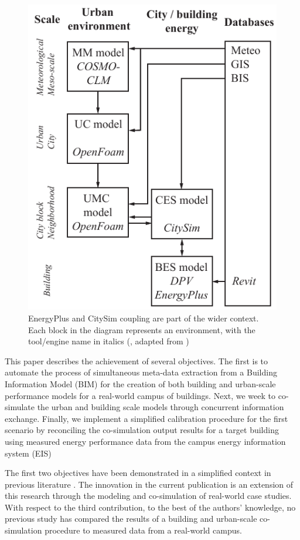 \documentclass{tBPS2e}
\theoremstyle{plain}
\theoremstyle{definition}
\theoremstyle{remark}
\newcommand{\noteDT}[1]{\footnote{\textcolor{green}{#1}}}
\begin{document}
\begin{figure}[H]
\centering
\includegraphics[scale=0.7]{figures/UMEM_overview_new}
\caption{EnergyPlus and CitySim coupling are part of the wider context. Each
block in the diagram represents an environment, with the tool/engine name in
italics (\citep{thomas_multiscale_2014}, adapted from \citep{dorer_modelling_2013})}
\label{fig:UMEM}
\end{figure}

This paper describes the achievement of several objectives. The first is to
automate the process of simultaneous meta-data extraction from a
Building Information Model (BIM) for the creation of both building and
urban-scale performance models for a real-world campus of buildings. Next, we week to 
co-simulate the urban and building scale models through concurrent information exchange.
Finally, we implement a simplified calibration procedure for the first scenario by 
reconciling the co-simulation output results for a target building using measured energy 
performance data from the campus energy information system (EIS)

The first two objectives have been demonstrated in a simplified context in
previous literature \citep{thomas_customizable_2012,miller_long_2015}. The innovation
in the current publication is an extension of this research through the
modeling and co-simulation of real-world case studies. With respect to the
third contribution, to the best of the authors' knowledge, no previous study
has compared the results of a building and urban-scale co-simulation procedure
to measured data from a real-world campus.%
\end{document}
